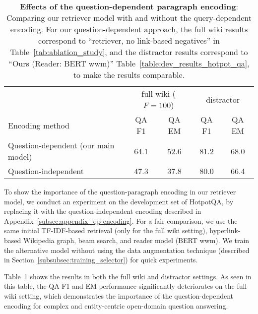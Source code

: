 \begin{table}[t]
\begin{center}
\begin{tabular}{ l | c c | c c }\toprule 
 & \multicolumn{2}{|c}{full wiki ($F=100$)} & \multicolumn{2}{|c}{distractor} \\
 Encoding method  & QA F1 & QA EM & QA F1 & QA EM \\
  \midrule
  Question-dependent (our main model)  & 64.1 & 52.6 & 81.2 & 68.0 \\
  Question-independent                 & 47.3 & 37.8 & 80.0 & 66.4 \\
  \bottomrule
\end{tabular}
    \caption{{\bf Effects of the question-dependent paragraph encoding}: Comparing our retriever model with and without the query-dependent encoding. For our question-dependent approach, the full wiki results correspond to ``retriever, no link-based negatives'' in Table~\ref{tab:ablation_study}, and the distractor results correspond to ``Ours (Reader: BERT wwm)'' Table~\ref{table:dev_results_hotpot_qa}, to make the results comparable.
    }\label{table:query_independent_results}
\end{center}
\end{table}

To show the importance of the question-paragraph encoding in our retriever model, we conduct an experiment on the development set of HotpotQA, by replacing it with the question-independent encoding described in Appendix~\ref{subsec:appendix_qp-encoding}.
For a fair comparison, we use the same initial TF-IDF-based retrieval (only for the full wiki setting), hyperlink-based Wikipedia graph, beam search, and reader model (BERT wwm).
We train the alternative model without using the data augmentation technique (described in Section~\ref{subsubsec:training_selector}) for quick experiments.

Table~\ref{table:query_independent_results} shows the results in both the full wiki and distractor settings.
As seen in this table, the QA F1 and EM performance significantly deteriorates on the full wiki setting, which demonstrates the importance of the question-dependent encoding for complex and entity-centric open-domain question answering.

